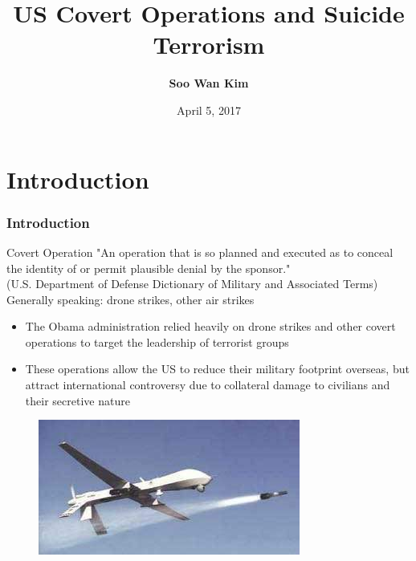 \documentclass{beamer}
\title[Title]{US Covert Operations and Suicide Terrorism}
\author[Yourname]{\textbf{Soo Wan Kim}}
\date[Short Occasion]{April 5, 2017}
\begin{document}
\begin{frame}
  \titlepage
\end{frame}

\section{Introduction}

  \begin{frame}
    \frametitle{Introduction}
	\begin{block}{Covert Operation}
"An operation that is so planned and executed as to conceal the identity of or permit plausible denial by the sponsor." 
\\
\footnotesize(U.S. Department of Defense Dictionary of Military and Associated Terms)
\\
\vspace{2mm}
\small Generally speaking: drone strikes, other air strikes
    \end{block}
    \begin{itemize}
      \item The Obama administration relied heavily on drone strikes and other covert operations to target the leadership of terrorist groups
	\item These operations allow the US to reduce their military footprint overseas, but attract international controversy due to collateral damage to civilians and their secretive nature
    \end{itemize}
  \end{frame}

  \begin{frame}
	\begin{figure}[h!]
		\includegraphics[width=\linewidth]{Predator_and_Hellfire.jpg}
	\end{figure}
  \end{frame}
\end{document}
